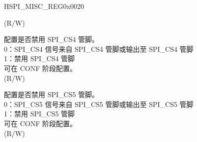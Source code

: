 \begin{register}{H}{SPI\_MISC\_REG}{0x0020}
\begin{regdesc}
\begin{reglist}
(R/W)
\label{fielddesc:SPICS4DIS}\item [SPI\_CS4\_DIS]  配置是否禁用 SPI\_CS4 管脚。\\
0：SPI\_CS4 信号来自 SPI\_CS4 管脚或输出至 SPI\_CS4 管脚\\
1：禁用 SPI\_CS4 管脚\\
可在 CONF 阶段配置。 \\
(R/W)
\label{fielddesc:SPICS5DIS}\item [SPI\_CS5\_DIS]  配置是否禁用 SPI\_CS5 管脚。\\
0：SPI\_CS5 信号来自 SPI\_CS5 管脚或输出至 SPI\_CS5 管脚\\
1：禁用 SPI\_CS5 管脚\\
可在 CONF 阶段配置。 \\
(R/W)
\item [见下页]
\end{reglist}\end{regdesc}
\end{register}

